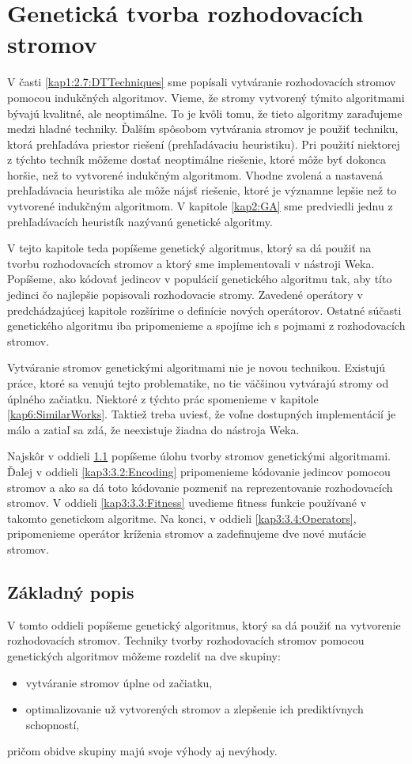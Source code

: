 \chapter{Genetická tvorba rozhodovacích stromov}\label{kap3:DTGA}
V časti \ref{kap1:2.7:DTTechniques} sme popísali vytváranie rozhodovacích stromov pomocou indukčných algoritmov. Vieme, že stromy vytvorený týmito algoritmami bývajú kvalitné, ale neoptimálne. To je kvôli tomu, že tieto algoritmy zaraďujeme medzi hladné techniky. Ďalším spôsobom vytvárania stromov je použiť techniku, ktorá prehľadáva priestor riešení (prehľadávaciu heuristiku). Pri použití niektorej z týchto techník môžeme dostať neoptimálne riešenie, ktoré môže byť dokonca horšie, než to vytvorené indukčným algoritmom. Vhodne zvolená a nastavená prehľadávacia heuristika ale môže nájsť riešenie, ktoré je významne lepšie než to vytvorené indukčným algoritmom. V kapitole \ref{kap2:GA} sme predviedli jednu z prehľadávacích heuristík nazývanú genetické algoritmy.

V tejto kapitole teda popíšeme genetický algoritmus, ktorý sa dá použiť na tvorbu rozhodovacích stromov a ktorý sme implementovali v nástroji Weka. Popíšeme, ako kódovať jedincov v populácií genetického algoritmu tak, aby títo jedinci čo najlepšie popisovali rozhodovacie stromy. Zavedené operátory v predchádzajúcej kapitole rozšírime o definície nových operátorov. Ostatné súčasti genetického algoritmu iba pripomenieme a spojíme ich s pojmami z rozhodovacích stromov.

Vytváranie stromov genetickými algoritmami nie je novou technikou. Existujú práce, ktoré sa venujú tejto problematike, no tie väčšinou vytvárajú stromy od úplného začiatku. Niektoré z týchto prác spomenieme v kapitole \ref{kap6:SimilarWorks}. Taktiež treba uviesť, že voľne dostupných implementácií je málo a zatiaľ sa zdá, že neexistuje žiadna do nástroja Weka.

Najskôr v oddieli \ref{kap3:3.1:Intro} popíšeme úlohu tvorby stromov genetickými algoritmami. Ďalej v oddieli \ref{kap3:3.2:Encoding} pripomenieme kódovanie jedincov pomocou stromov a ako sa dá toto kódovanie pozmeniť na reprezentovanie rozhodovacích stromov. V oddieli \ref{kap3:3.3:Fitness} uvedieme fitness funkcie používané v takomto genetickom algoritme. Na konci, v oddieli \ref{kap3:3.4:Operators}, pripomenieme operátor kríženia stromov a zadefinujeme dve nové mutácie stromov.
\section{Základný popis}\label{kap3:3.1:Intro}
V tomto oddieli popíšeme genetický algoritmus, ktorý sa dá použiť na vytvorenie rozhodovacích stromov. Techniky tvorby rozhodovacích stromov pomocou genetických algoritmov môžeme rozdeliť na dve skupiny:
\begin{itemize}
\item vytváranie stromov úplne od začiatku,
\item optimalizovanie už vytvorených stromov a zlepšenie ich prediktívnych schopností,
\end{itemize}
pričom obidve skupiny majú svoje výhody aj nevýhody.

